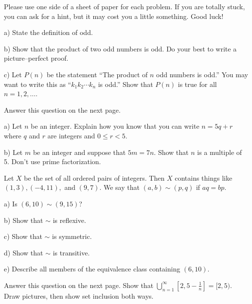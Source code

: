 \yourname


\noindent
Please use one side of a sheet of paper for each problem.
If you are totally stuck, you can ask for a hint, but it may cost you a little something.
Good luck!

\vspace{0.2in}

\blist{0.0in}
\item a) State the definition of odd.

b) Show that the product of two odd numbers is odd.
Do your best to write a picture--perfect proof.

c) Let $P(n)$ be the statement ``The product of $n$ odd numbers is odd.''
You may want to write this as ``$k_1 k_2 \cdots k_n$ is odd.''
Show that $P(n)$ is true for all $n = 1, 2, \ldots$.

\vfill


\item Answer this question on the next page.

a) Let $n$ be an integer.
Explain how you know that you can write $n = 5q + r$ where $q$ and $r$ are integers and $0 \leq r < 5$.

b) Let $m$ be an integer and suppose that $5m = 7n$.
Show that $n$ is a multiple of 5.
Don't use prime factorization.

\pagebreak

\item Let $X$ be the set of all ordered pairs of integers.
Then $X$ contains things like $(1,3), (-4,11),$ and $(9,7)$.
We say that $(a,b) \sim (p,q)$ if $aq = bp$.

\noindent
a) Is $(6,10) \sim (9,15)$?

\vspace*{1in}
\noindent
b) Show that $\sim$ is reflexive.

\vspace*{1in}
\noindent
c) Show that $\sim$ is symmetric.

\vspace*{1in}
\noindent
d) Show that $\sim$ is transitive.

\vspace*{1in}
\noindent
e) Describe all members of the equivalence class containing $(6,10)$.

\vfill

\item Answer this question on the next page.
Show that $\bigcup_{n=1}^{\infty} [2, 5-\frac{1}{n}] = [2,5)$.  Draw pictures, then show set inclusion both ways.

